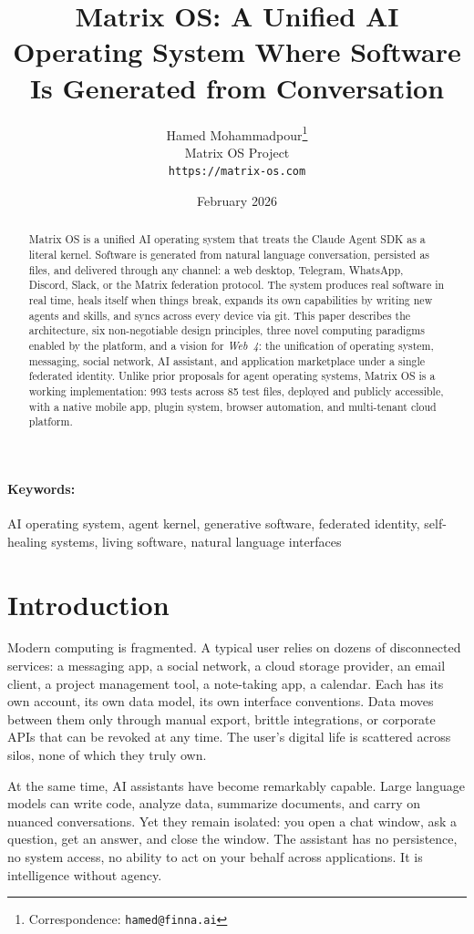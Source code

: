 \documentclass[11pt,a4paper]{article}
\title{\textbf{Matrix OS: A Unified AI Operating System Where Software Is Generated from Conversation}}
\author{
  Hamed Mohammadpour\thanks{Correspondence: \texttt{hamed@finna.ai}} \\
  Matrix OS Project \\
  \texttt{https://matrix-os.com}
}
\date{February 2026}
\begin{document}
\maketitle

\begin{abstract}
Matrix OS is a unified AI operating system that treats the Claude Agent SDK as a literal kernel. Software is generated from natural language conversation, persisted as files, and delivered through any channel: a web desktop, Telegram, WhatsApp, Discord, Slack, or the Matrix federation protocol. The system produces real software in real time, heals itself when things break, expands its own capabilities by writing new agents and skills, and syncs across every device via git. This paper describes the architecture, six non-negotiable design principles, three novel computing paradigms enabled by the platform, and a vision for \emph{Web~4}: the unification of operating system, messaging, social network, AI assistant, and application marketplace under a single federated identity. Unlike prior proposals for agent operating systems, Matrix OS is a working implementation: 993 tests across 85 test files, deployed and publicly accessible, with a native mobile app, plugin system, browser automation, and multi-tenant cloud platform.
\end{abstract}

\paragraph{Keywords:} AI operating system, agent kernel, generative software, federated identity, self-healing systems, living software, natural language interfaces

\section{Introduction}

Modern computing is fragmented. A typical user relies on dozens of disconnected services: a messaging app, a social network, a cloud storage provider, an email client, a project management tool, a note-taking app, a calendar. Each has its own account, its own data model, its own interface conventions. Data moves between them only through manual export, brittle integrations, or corporate APIs that can be revoked at any time. The user's digital life is scattered across silos, none of which they truly own.

At the same time, AI assistants have become remarkably capable. Large language models can write code, analyze data, summarize documents, and carry on nuanced conversations. Yet they remain isolated: you open a chat window, ask a question, get an answer, and close the window. The assistant has no persistence, no system access, no ability to act on your behalf across applications. It is intelligence without agency.
\end{document}

